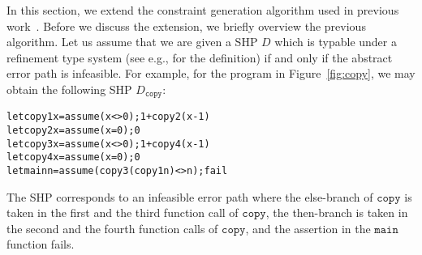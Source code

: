 In this section, we extend the constraint generation algorithm used in
previous work~\cite{Unno2009,Terauchi2010,KobayashiPLDI2011}.  Before we
discuss the extension, we briefly overview the previous algorithm.  Let
us assume that we are given a SHP \(D\) which is typable under a
refinement type system (see e.g., \cite{Unno2009} for the definition) if
and only if the abstract error path is infeasible.  For example, for the
program in Figure~\ref{fig:copy}, we may obtain the following SHP
\(D_{\texttt{copy}}\):
\begin{alltt}
let copy1 x = assume (x<>0); 1 + copy2 (x-1)
let copy2 x = assume (x=0); 0
let copy3 x = assume (x<>0); 1 + copy4 (x-1)
let copy4 x = assume (x=0); 0
let main n = assume (copy3 (copy1 n) <> n); fail
\end{alltt}
The SHP corresponds to an infeasible error path where the else-branch of
\(\texttt{copy}\) is taken in the first and the third function call of
\(\texttt{copy}\), the then-branch is taken in the second and the fourth
function calls of \(\texttt{copy}\), and the assertion in the
\(\texttt{main}\) function fails.

